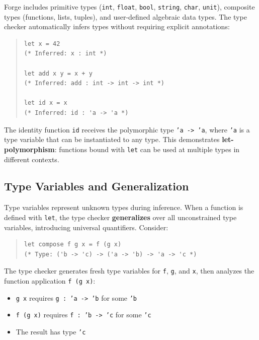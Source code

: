 \documentclass[conference,onecolumn]{IEEEtran}
\begin{document}
Forge includes primitive types (\texttt{int}, \texttt{float}, \texttt{bool}, \texttt{string}, \texttt{char}, \texttt{unit}), composite types (functions, lists, tuples), and user-defined algebraic data types. The type checker automatically infers types without requiring explicit annotations:

\begin{quote}
\small
\begin{verbatim}
let x = 42
(* Inferred: x : int *)

let add x y = x + y
(* Inferred: add : int -> int -> int *)

let id x = x
(* Inferred: id : 'a -> 'a *)
\end{verbatim}
\end{quote}

The identity function \texttt{id} receives the polymorphic type \texttt{'a -> 'a}, where \texttt{'a} is a type variable that can be instantiated to any type. This demonstrates \textbf{let-polymorphism}: functions bound with \texttt{let} can be used at multiple types in different contexts.

\subsection{Type Variables and Generalization}

Type variables represent unknown types during inference. When a function is defined with \texttt{let}, the type checker \textbf{generalizes} over all unconstrained type variables, introducing universal quantifiers. Consider:

\begin{quote}
\small
\begin{verbatim}
let compose f g x = f (g x)
(* Type: ('b -> 'c) -> ('a -> 'b) -> 'a -> 'c *)
\end{verbatim}
\end{quote}

The type checker generates fresh type variables for \texttt{f}, \texttt{g}, and \texttt{x}, then analyzes the function application \texttt{f (g x)}:
\begin{itemize}
\item \texttt{g x} requires \texttt{g : 'a -> 'b} for some \texttt{'b}
\item \texttt{f (g x)} requires \texttt{f : 'b -> 'c} for some \texttt{'c}
\item The result has type \texttt{'c}
\end{itemize}
\end{document}
